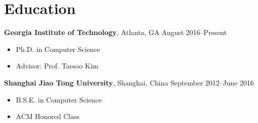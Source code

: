 \section*{Education}

\begin{description}
\item {\bf Georgia Institute of Technology}, Atlanta, GA \dotfill August 2016--Present
  \begin{itemize}
  \item Ph.D. in Computer Science
  \item Advisor: Prof. Taesoo Kim
  \end{itemize}
  
\item {\bf Shanghai Jiao Tong University}, Shanghai, China \dotfill September 2012--June 2016
  \begin{itemize}
  \item B.S.E. in Computer Science
  \item ACM Honored Class
  \end{itemize}

\end{description}
